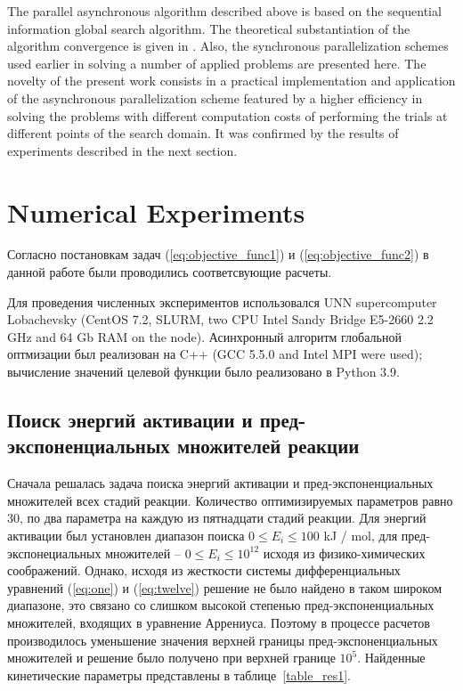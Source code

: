\documentclass{svproc}
\begin{document}
The parallel asynchronous algorithm described above is based on the sequential information global search algorithm. The theoretical substantiation of the algorithm convergence is given in \cite{Strongin2000}. Also, the synchronous parallelization schemes used earlier in solving a number of applied problems \cite{Kalyulin2017,Modorskii2016} are presented here.
The novelty of the present work consists in a practical implementation and application of the asynchronous parallelization scheme featured by a higher efficiency in solving the problems with different computation costs of performing the trials at different points of the search domain. 
It was confirmed by the results of experiments described in the next section.

\section{Numerical Experiments}\label{Sec_Exp}

Согласно постановкам задач (\ref{eq:objective_func1}) и (\ref{eq:objective_func2}) в данной работе были проводились соответсвующие расчеты.

Для проведения численных экспериментов использовался UNN supercomputer Lobachevsky (CentOS 7.2, SLURM, two CPU Intel Sandy Bridge E5-2660 2.2 GHz and 64 Gb RAM on the node). Асинхронный алгоритм глобальной оптмизации был реализован на C++ (GCC 5.5.0 and Intel MPI were used); вычисление значений целевой функции было реализовано в Python 3.9.

\subsection{Поиск энергий активации и пред-экспоненциальных множителей реакции}

Сначала решалась задача поиска энергий активации и пред-экспоненциальных множителей всех стадий реакции. Количество оптимизируемых параметров равно 30, по два параметра на каждую из пятнадцати стадий реакции. Для энергий активации был установлен диапазон поиска $0 \leq E_i \leq 100$ kJ / mol, для пред-экспонециальных множителей -- $0 \leq E_i \leq 10^{12}$ исходя из физико-химических соображений. Однако, исходя из жесткости системы дифференциальных уравнений (\ref{eq:one}) и (\ref{eq:twelve}) решение не было найдено в таком широком диапазоне, это связано со слишком высокой степенью пред-экспоненциальных множителей, входящих в уравнение Аррениуса. Поэтому в процессе расчетов производилось уменьшение значения верхней границы пред-экспоненциальных множителей и решение было получено при верхней границе $10^5$. Найденные кинетические параметры представлены в таблице~\ref{table_res1}. 
\end{document}
